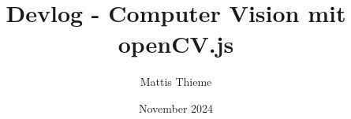 \documentclass{article}
\title{Devlog - Computer Vision mit openCV.js}
\author{Mattis Thieme}
\date{November 2024}
\begin{document}
\maketitle \newpage

\renewcommand*\contentsname{Inhaltsverzeichnis} %
\tableofcontents \newpage

 \newpage

 \newpage

 \newpage

 \newpage

 \newpage

 \newpage

 \newpage

 \newpage
\end{document}
